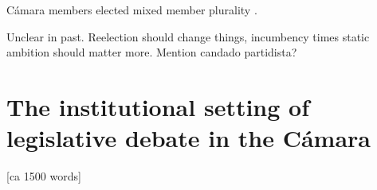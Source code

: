 \documentclass[letter,12pt]{article}
\begin{document}
Cámara members elected mixed member plurality \citep{weldonMixedMemberSys2001}.


Unclear in past. Reelection should change things, incumbency times static ambition should matter more. Mention candado partidista? 

\section{The institutional setting of legislative debate in the Cámara} [ca 1500 words]


\end{document}
